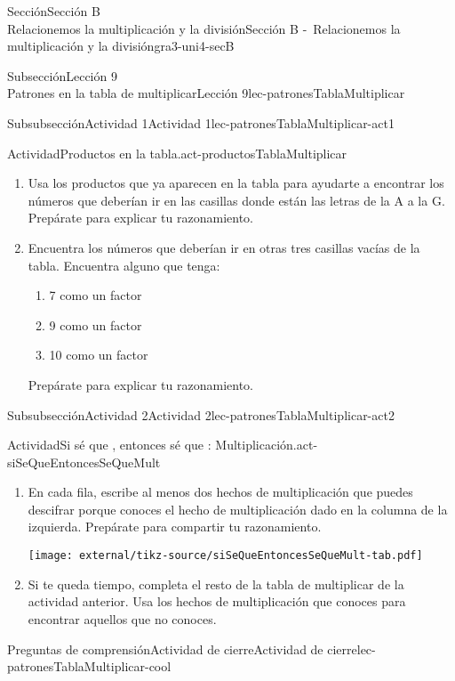 \begin{sectionptx}{Sección}{{\Large Sección B\\}Relacionemos la multiplicación y la división}{}{Sección B -~Relacionemos la multiplicación y la división}{}{}{gra3-uni4-secB}
\begin{subsectionptx}{Subsección}{{\normalsize Lección 9\\[-0.05cm]}Patrones en la tabla de multiplicar}{}{Lección 9}{}{}{lec-patronesTablaMultiplicar}
\begin{subsubsectionptx}{Subsubsección}{Actividad 1}{}{Actividad 1}{}{}{lec-patronesTablaMultiplicar-act1}
\begin{activity}{Actividad}{Productos en la tabla.}{act-productosTablaMultiplicar}
\begin{enumerate}
\item{}Usa los productos que ya aparecen en la tabla para ayudarte a encontrar los números que deberían ir en las casillas donde están las letras de la A a la G. Prepárate para explicar tu razonamiento.%
\item{}Encuentra los números que deberían ir en otras tres casillas vacías de la tabla. Encuentra alguno que tenga:%
%
\begin{enumerate}
\item{}7 como un factor%
\item{}9 como un factor%
\item{}10 como un factor%
\end{enumerate}
Prepárate para explicar tu razonamiento.%
\end{enumerate}
\end{activity}%
\end{subsubsectionptx}
%
%
\typeout{************************************************}
\typeout{************************************************}
%
\begin{subsubsectionptx}{Subsubsección}{Actividad 2}{}{Actividad 2}{}{}{lec-patronesTablaMultiplicar-act2}
\begin{activity}{Actividad}{Si sé que \textellipsis{}, entonces sé que \textellipsis{}: Multiplicación.}{act-siSeQueEntoncesSeQueMult}%
%
\begin{enumerate}
\item{}En cada fila, escribe al menos dos hechos de multiplicación que puedes descifrar porque conoces el hecho de multiplicación dado en la columna de la izquierda. Prepárate para compartir tu razonamiento.%
\begin{image}{0}{1}{0}{}%
\texttt{[image: external/tikz-source/siSeQueEntoncesSeQueMult-tab.pdf]}
\end{image}%
\item{}Si te queda tiempo, completa el resto de la tabla de multiplicar de la actividad anterior. Usa los hechos de multiplicación que conoces para encontrar aquellos que no conoces.%
\end{enumerate}
\end{activity}%
\end{subsubsectionptx}
%
%
\typeout{************************************************}
\typeout{************************************************}
%
\begin{reading-questions-subsubsection}{Preguntas de comprensión}{Actividad de cierre}{}{Actividad de cierre}{}{}{lec-patronesTablaMultiplicar-cool}

\end{reading-questions-subsubsection}
\end{subsectionptx}
\end{sectionptx}
